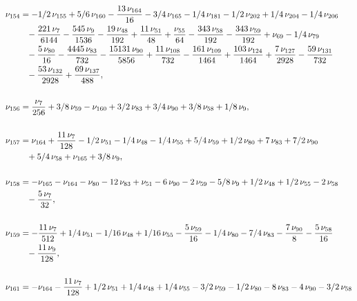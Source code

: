 \documentclass[a4paper,12pt, DIV=14, BCOR=5mm, twoside, headsepline]{scrbook}
\begin{document}
\begin{align}\label{AreaSol14}
\begin{aligned}
\nu_{{154}}&=-1/2\,\nu_{{155}}+5/6\,\nu_{{160}}-{\frac {13\,\nu_{
{164}}}{16}}-3/4\,\nu_{{165}}-1/4\,\nu_{{181}}-1/2\,\nu_{{202}}+1/4\,
\nu_{{204}}-1/4\,\nu_{{206}}\\
 &\hphantom{=}-{\frac {221\,\nu_{{7}}}{6144}}-{\frac {
545\,\nu_{{9}}}{1536}}-{\frac {19\,\nu_{{48}}}{192}}+{\frac {11\,\nu_{
{51}}}{48}}+{\frac {\nu_{{55}}}{64}}-{\frac {343\,\nu_{{58}}}{192}}-{
\frac {343\,\nu_{{59}}}{192}}+\nu_{{69}}-1/4\,\nu_{{79}}\\
 &\hphantom{=}-{\frac {5\,
\nu_{{80}}}{16}}-{\frac {4445\,\nu_{{83}}}{732}}-{\frac {15131\,\nu_{{
90}}}{5856}}+{\frac {11\,\nu_{{108}}}{732}}-{\frac {161\,\nu_{{109}}}{
1464}}+{\frac {103\,\nu_{{124}}}{1464}}+{\frac {7\,\nu_{{127}}}{2928}}
-{\frac {59\,\nu_{{131}}}{732}}\\
 &\hphantom{=}-{\frac {53\,\nu_{{132}}}{2928}}+{
\frac {69\,\nu_{{137}}}{488}}, \\
\\
\nu_{{156}}&={\frac {\nu_{{7}}}{256}}+3/8
\,\nu_{{59}}-\nu_{{160}}+3/2\,\nu_{{83}}+3/4\,\nu_{{90}}+3/8\,\nu_{{58
}}+1/8\,\nu_{{9}}, \\
\\
\nu_{{157}}&=\nu_{{164}}+{\frac {11\,\nu_{{7}}}{128}}
-1/2\,\nu_{{51}}-1/4\,\nu_{{48}}-1/4\,\nu_{{55}}+5/4\,\nu_{{59}}+1/2\,
\nu_{{80}}+7\,\nu_{{83}}+7/2\,\nu_{{90}}\\
 &\hphantom{=}+5/4\,\nu_{{58}}+\nu_{{165}}+3
/8\,\nu_{{9}}, \\
\\
\nu_{{158}}&=-\nu_{{165}}-\nu_{{164}}-\nu_{{80}}-12\,\nu_
{{83}}+\nu_{{51}}-6\,\nu_{{90}}-2\,\nu_{{59}}-5/8\,\nu_{{9}}+1/2\,\nu_
{{48}}+1/2\,\nu_{{55}}-2\,\nu_{{58}}\\
 &\hphantom{=}-{\frac {5\,\nu_{{7}}}{32}}, \\
\\
\nu_{{
159}}&=-{\frac {11\,\nu_{{7}}}{512}}+1/4\,\nu_{{51}}-1/16\,\nu_{{48}}+1
/16\,\nu_{{55}}-{\frac {5\,\nu_{{59}}}{16}}-1/4\,\nu_{{80}}-7/4\,\nu_{
{83}}-{\frac {7\,\nu_{{90}}}{8}}-{\frac {5\,\nu_{{58}}}{16}}\\
 &\hphantom{=}-{\frac {
11\,\nu_{{9}}}{128}}, \\
\\
\nu_{{161}}&=-\nu_{{164}}-{\frac {11\,\nu_{{7}}}{
128}}+1/2\,\nu_{{51}}+1/4\,\nu_{{48}}+1/4\,\nu_{{55}}-3/2\,\nu_{{59}}-
1/2\,\nu_{{80}}-8\,\nu_{{83}}-4\,\nu_{{90}}-3/2\,\nu_{{58}}\\

\end{aligned}
\end{align}
\end{document}

